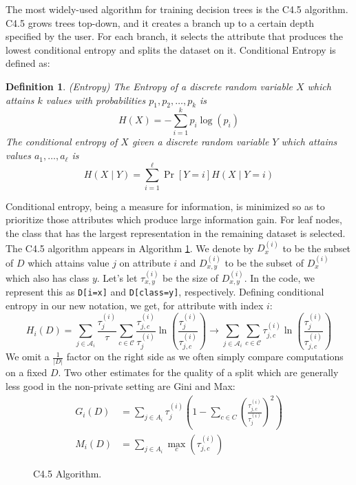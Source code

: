 \documentclass[11pt]{article}
\newtheorem{defn}{Definition}
\begin{document}
The most widely-used algorithm for training decision trees is the C4.5 algorithm. C4.5 grows trees top-down, and it creates a branch up to a certain depth specified by the user. For each branch, it selects the attribute that produces the lowest conditional entropy and splits the dataset on it. Conditional Entropy is defined as:
\begin{defn}
(Entropy) The Entropy of a discrete random variable $X$ which attains $k$ values with probabilities $p_1, p_2, \ldots, p_k$ is
\[
H(X) = -\sum_{i=1}^k p_i \log(p_i)
\]
The conditional entropy of $X$ given a discrete random variable $Y$ which attains values $a_1, \ldots, a_\ell$ is
\[
H(X\mid Y) = \sum_{i=1}^\ell \Pr[Y=i] H(X\mid Y=i)
\]
\end{defn}
Conditional entropy, being a measure for information, is minimized so as to prioritize those attributes which produce large information gain. For leaf nodes, the class that has the largest representation in the remaining dataset is selected. The C4.5 algorithm appears in Algorithm \ref{alg:c45}.
We denote by $D^{(i)}_{x}$ to be the subset of $D$ which attains value $j$ on attribute $i$ and $D^{(i)}_{x,y}$ to be the subset of $D^{(i)}_{x}$ which also has class $y$. Let's let $\tau^{(i)}_{x,y}$ be the size of $D^{(i)}_{x,y}$. In the code, we represent this as \texttt{D[i=x]} and \texttt{D[class=y]}, respectively. Defining conditional entropy in our new notation, we get, for attribute with index $i$:
\begin{equation}\label{eq:cond_ent}
H_i(D) = 
\sum_{j\in \mathcal{A}_i} \frac{\tau^{(i)}_{j}}{\tau}\sum_{c \in \mathcal{C}} \frac{\tau^{(i)}_{j,c}}{\tau^{(i)}_{j}}\ln\left(\frac{\tau^{(i)}_{j}}{\tau^{(i)}_{j,c}}\right) \rightarrow \sum_{j\in \mathcal{A}_i}\sum_{c \in \mathcal{C}} {\tau^{(i)}_{j,c}}\ln\left(\frac{\tau^{(i)}_{j}}{\tau^{(i)}_{j,c}}\right)
\end{equation}
We omit a $\frac{1}{|D|}$ factor on the right side as we often simply compare computations on a fixed $D$. Two other estimates for the quality of a split which are generally less good in the non-private setting are Gini and Max:
\begin{align}
G_i(D) &= \sum_{j \in A_i} \tau^{(i)}_j\left(1-\sum_{c \in C}\left(\frac{\tau^{(i)}_{j,c}}{\tau^{(i)}_{j}}\right)^2\right)\label{eq:gini} \\
M_i(D) &= \sum_{j \in A_i} \max_c(\tau^{(i)}_{j,c})
\label{eq:max}
\end{align}
\begin{figure}


\caption{C4.5 Algorithm.}\label{alg:c45}
\end{figure}
\end{document}
